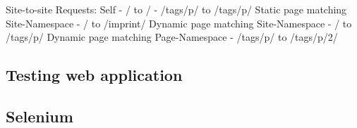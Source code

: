\documentclass[f,bachelor,binding,twoside,palatino]{WeSTthesis}
\def \ajax {AJAX}
\def \pjaxr {PJAXR}
\begin{document}
  Site-to-site Requests:
    Self
      - / to /
      - /tags/p/ to /tags/p/
    Static page matching Site-Namespace
      - / to /imprint/
    Dynamic page matching Site-Namespace
      - / to /tags/p/
    Dynamic page matching Page-Namespace
      - /tags/p/ to /tags/p/2/

%
%
%


\subsection{Testing web application}

\subsection{Selenium}
\end{document}
